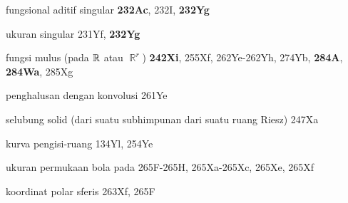 

fungsional aditif singular {\bf 232Ac}, 232I, {\bf 232Yg}




ukuran singular 231Yf, {\bf 232Yg}















fungsi mulus (pada $\Bbb R$ atau $\BbbR^r$) {\bf 242Xi}, 255Xf,
262Ye-262Yh, 
274Yb, {\bf 284A}, {\bf 284Wa}, 285Xg




penghalusan dengan konvolusi 261Ye







selubung solid (dari suatu subhimpunan dari suatu ruang Riesz) 247Xa

































kurva pengisi-ruang 134Yl, 254Ye 








ukuran permukaan bola pada 265F-265H, 
265Xa-265Xc, 
265Xe, 265Xf




koordinat polar sferis 263Xf, 265F














